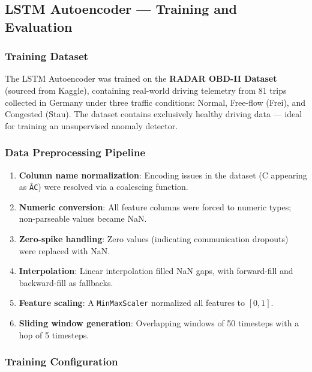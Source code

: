 \subsection{LSTM Autoencoder --- Training and Evaluation}

\subsubsection{Training Dataset}

The LSTM Autoencoder was trained on the \textbf{RADAR OBD-II Dataset} (sourced from Kaggle), containing real-world driving telemetry from 81 trips collected in Germany under three traffic conditions: Normal, Free-flow (Frei), and Congested (Stau). The dataset contains exclusively healthy driving data --- ideal for training an unsupervised anomaly detector.

\subsubsection{Data Preprocessing Pipeline}

\begin{enumerate}
    \item \textbf{Column name normalization}: Encoding issues in the dataset (\textdegree C appearing as \texttt{Â\textdegree C}) were resolved via a coalescing function.
    \item \textbf{Numeric conversion}: All feature columns were forced to numeric types; non-parseable values became NaN.
    \item \textbf{Zero-spike handling}: Zero values (indicating communication dropouts) were replaced with NaN.
    \item \textbf{Interpolation}: Linear interpolation filled NaN gaps, with forward-fill and backward-fill as fallbacks.
    \item \textbf{Feature scaling}: A \texttt{MinMaxScaler} normalized all features to $[0, 1]$.
    \item \textbf{Sliding window generation}: Overlapping windows of 50 timesteps with a hop of 5 timesteps.
\end{enumerate}

\subsubsection{Training Configuration}

